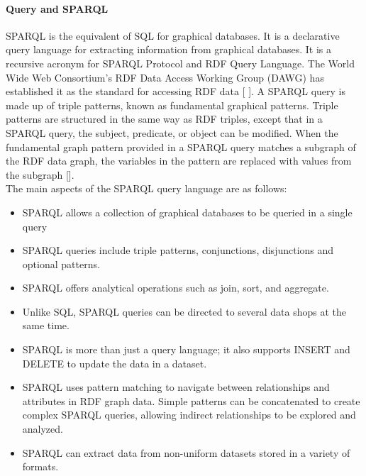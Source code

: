             \paragraph{Query and SPARQL\label{para:sparql}}
            SPARQL is the equivalent of SQL for graphical databases. It is a declarative query language for extracting information from graphical databases. It is a recursive acronym for SPARQL Protocol and RDF Query Language. The World Wide Web Consortium's RDF Data Access Working Group (DAWG) has established it as the standard for accessing RDF data [ ]. A SPARQL query is made up of triple patterns, known as fundamental graphical patterns. Triple patterns are structured in the same way as RDF triples, except that in a SPARQL query, the subject, predicate, or object can be modified. When the fundamental graph pattern provided in a SPARQL query matches a subgraph of the RDF data graph, the variables in the pattern are replaced with values from the subgraph [].\\
        
            The main aspects of the SPARQL query language are as follows: 
        
            \begin{itemize}
                \item SPARQL allows a collection of graphical databases to be queried in a single query 
                \item SPARQL queries include triple patterns, conjunctions, disjunctions and optional patterns. 
                \item SPARQL offers analytical operations such as join, sort, and aggregate. 
                \item Unlike SQL, SPARQL queries can be directed to several data shops at the same time. 
                \item SPARQL is more than just a query language; it also supports INSERT and DELETE to update the data in a dataset.
                \item SPARQL uses pattern matching to navigate between relationships and attributes in RDF graph data. Simple patterns can be concatenated to create complex SPARQL queries, allowing indirect relationships to be explored and analyzed. 
                \item SPARQL can extract data from non-uniform datasets stored in a variety of formats.
            \end{itemize}


